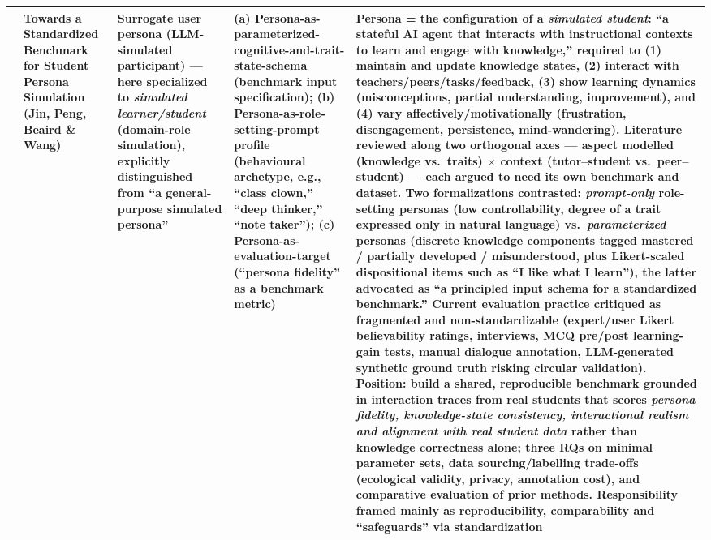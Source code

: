 \begin{table}[t]
\begin{tabular}{p{0.5cm} p{3.6cm} p{3.4cm} p{3.6cm} p{3.6cm}}
\addlinespace
12 & Towards a Standardized Benchmark for Student Persona Simulation (Jin, Peng, Beaird \& Wang) &
Surrogate user persona (LLM-simulated participant) --- here specialized to \emph{simulated learner/student} (domain-role simulation), explicitly distinguished from ``a general-purpose simulated persona'' &
(a) Persona-as-parameterized-cognitive-and-trait-state-schema (benchmark input specification); (b) Persona-as-role-setting-prompt profile (behavioural archetype, e.g., ``class clown,'' ``deep thinker,'' ``note taker''); (c) Persona-as-evaluation-target (``persona fidelity'' as a benchmark metric) &
Persona = the configuration of a \emph{simulated student}: ``a stateful AI agent that interacts with instructional contexts to learn and engage with knowledge,'' required to (1) maintain and update knowledge states, (2) interact with teachers/peers/tasks/feedback, (3) show learning dynamics (misconceptions, partial understanding, improvement), and (4) vary affectively/motivationally (frustration, disengagement, persistence, mind-wandering). Literature reviewed along two orthogonal axes --- aspect modelled (knowledge vs.\ traits) $\times$ context (tutor--student vs.\ peer--student) --- each argued to need its own benchmark and dataset. Two formalizations contrasted: \emph{prompt-only} role-setting personas (low controllability, degree of a trait expressed only in natural language) vs.\ \emph{parameterized} personas (discrete knowledge components tagged mastered / partially developed / misunderstood, plus Likert-scaled dispositional items such as ``I like what I learn''), the latter advocated as ``a principled input schema for a standardized benchmark.'' Current evaluation practice critiqued as fragmented and non-standardizable (expert/user Likert believability ratings, interviews, MCQ pre/post learning-gain tests, manual dialogue annotation, LLM-generated synthetic ground truth risking circular validation). Position: build a shared, reproducible benchmark grounded in interaction traces from real students that scores \emph{persona fidelity, knowledge-state consistency, interactional realism and alignment with real student data} rather than knowledge correctness alone; three RQs on minimal parameter sets, data sourcing/labelling trade-offs (ecological validity, privacy, annotation cost), and comparative evaluation of prior methods. Responsibility framed mainly as reproducibility, comparability and ``safeguards'' via standardization \\
\bottomrule
\end{tabular}
\end{table}
